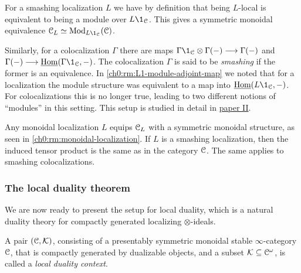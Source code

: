 \begin{remark}
    \label{ch0:rm:smashing-then-modules-over-unit}
    For a smashing localization $L$ we have by definition that being $L$-local is equivalent to being a module over $L\1_\C$. This gives a symmetric monoidal equivalence $\C_L \simeq \Mod_{L\1_\C}(\C)$. 
\end{remark}

\begin{remark}
    \label{ch0:rm:smashing-colocalization}
    Similarly, for a colocalization $\Gamma$ there are maps $\Gamma \1_\C \otimes \Gamma(-)\longrightarrow \Gamma (-)$ and $\Gamma(-)\longrightarrow \iHom(\Gamma \1_\C, -)$. The colocalization $\Gamma$ is said to be \emph{smashing} if the former is an equivalence. In \cref{ch0:rm:L1-module-adjoint-map} we noted that for a localization the module structure was equivalent to a map into $\iHom(L\1_\C,-)$. For colocalizations this is no longer true, leading to two different notions of ``modules'' in this setting. This setup is studied in detail in \hyperref[ch2]{paper II}. 
\end{remark}

\begin{remark}
    Any monoidal localization $L$ equips $\EuScript{C}_L$ with a symmetric monoidal structure, as seen in \cref{ch0:rm:monoidal-localization}. If $L$ is a smashing localization, then the induced tensor product is the same as in the category $\EuScript{C}$. The same applies to smashing colocalizations. 
\end{remark}





\subsubsection{The local duality theorem}

We are now ready to present the setup for local duality, which is a natural duality theory for compactly generated localizing $\otimes$-ideals. 

\begin{definition}
    \label{ch0:def:local-duality-context}
    A pair $(\EuScript{C}, \mathcal{K})$, consisting of a presentably symmetric monoidal stable $\infty$-category $\EuScript{C}$, that is compactly generated by dualizable objects, and a subset $\mathcal{K}\subseteq \EuScript{C}^\omega$, is called a \emph{local duality context}.
\end{definition}

